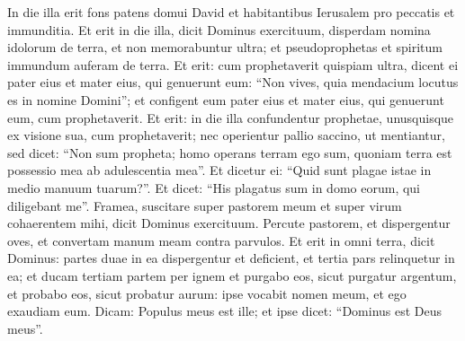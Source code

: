 \begin{biblechapter}  
\verse In die illa erit fons patens domui David et habitantibus Ierusalem pro peccatis et immunditia. 
\verse Et erit in die illa, dicit Dominus exercituum, disperdam nomina idolorum de terra, et non memorabuntur ultra; et pseudoprophetas et spiritum immundum auferam de terra. 
\verse Et erit: cum prophetaverit quispiam ultra, dicent ei pater eius et mater eius, qui genuerunt eum: “Non vives, quia mendacium locutus es in nomine Domini”; et configent eum pater eius et mater eius, qui genuerunt eum, cum prophetaverit. 
\verse Et erit: in die illa confundentur prophetae, unusquisque ex visione sua, cum prophetaverit; nec operientur pallio saccino, ut mentiantur, 
\verse sed dicet: “Non sum propheta; homo operans terram ego sum, quoniam terra est possessio mea ab adulescentia mea”. 
\verse Et dicetur ei: “Quid sunt plagae istae in medio manuum tuarum?”. Et dicet: “His plagatus sum in domo eorum, qui diligebant me”. 
\verse Framea, suscitare super pastorem meum et super virum cohaerentem mihi, dicit Dominus exercituum. Percute pastorem, et dispergentur oves, et convertam manum meam contra parvulos. 
\verse Et erit in omni terra, dicit Dominus: partes duae in ea dispergentur et deficient, et tertia pars relinquetur in ea; 
\verse et ducam tertiam partem per ignem et purgabo eos, sicut purgatur argentum, et probabo eos, sicut probatur aurum: ipse vocabit nomen meum, et ego exaudiam eum. Dicam: Populus meus est ille; et ipse dicet: “Dominus est Deus meus”. 
\end{biblechapter}

